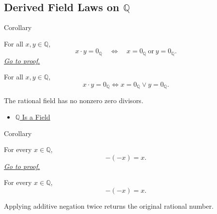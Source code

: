 \subsection*{\texorpdfstring{Derived Field Laws on $\mathbb{Q}$}{Derived Field Laws on Q}}

\begin{corollarybox}{Corollary}
\begin{corollary}
\label{cor:zero-product-on-q}
For all $x,y\in\mathbb{Q}$,
\[
x\cdot y=0_{\mathbb{Q}}
\quad\Longleftrightarrow\quad
x=0_{\mathbb{Q}}\ \text{or}\ y=0_{\mathbb{Q}}.
\]
\hyperref[prf:zero-product-on-q]{\textit{Go to proof.}}
\end{corollary}
\end{corollarybox}

\begin{remark*}
For all $x,y\in\mathbb{Q}$,
\[
x\cdot y=0_{\mathbb{Q}}
\Longleftrightarrow
x=0_{\mathbb{Q}}\lor y=0_{\mathbb{Q}}.
\]
\end{remark*}

\begin{remark*}[Interpretation]
The rational field has no nonzero zero divisors.
\end{remark*}

\begin{dependencies}
\begin{itemize}
  \item \hyperref[thm:q-is-a-field]{$\mathbb{Q}$ Is a Field}
\end{itemize}
\end{dependencies}

\begin{corollarybox}{Corollary}
\begin{corollary}
\label{cor:double-negation-on-q}
For every $x\in\mathbb{Q}$,
\[
-(-x)=x.
\]
\hyperref[prf:double-negation-on-q]{\textit{Go to proof.}}
\end{corollary}
\end{corollarybox}

\begin{remark*}
For every $x\in\mathbb{Q}$,
\[
-(-x)=x.
\]
\end{remark*}

\begin{remark*}[Interpretation]
Applying additive negation twice returns the original rational number.
\end{remark*}

